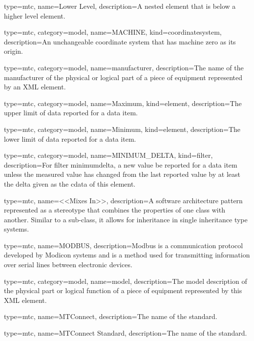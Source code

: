 {
  type=mtc,
  name={Lower Level},
  description={A nested element that is below a higher level element.}
}


{
  type=mtc,
  category=model,
  name={MACHINE},
  kind={coordinatesystem},
  description={An unchangeable coordinate system that has machine zero as its origin.}
}


{
  type=mtc,
  category=model,
  name={manufacturer},
  description={The name of the manufacturer of the physical or logical part of a piece of equipment represented by an XML element.}
}


{
  type=mtc,
  category=model,
  name={Maximum},
  kind={element},
  description={The upper limit of data reported for a data item.}
}


{
  type=mtc,
  category=model,
  name={Minimum},
  kind={element},
  description={The lower limit of data reported for a data item.}
}



{
  type=mtc,
  category=model,
  name={MINIMUM\_DELTA},
  kind={filter},
  description={For \gls{filter} \gls{minimumdelta}, a new value \MUSTNOT be reported for a data item unless the measured value has changed from the last reported value by at least the delta given as the \gls{cdata} of this element.}
}


{
  type=mtc,
  name={<<Mixes In>>},
  description={A software architecture pattern represented as a \gls{stereotype} that combines the properties of one class with another. Similar to a sub-class, it allows for inheritance in single inheritance type systems.}
}


{
  type=mtc,
  name=MODBUS,
  description={Modbus is a communication protocol developed by Modicon systems and is a method used for transmitting information over serial lines between electronic devices.}
}


{
  type=mtc,
  category=model,
  name={model},
  description={The model description of the physical part or logical function of a piece of equipment represented by this XML element.}
}


{
  type=mtc,
  name={MTConnect},
  description={The name of the standard.}
}

{
  type=mtc,
  name={MTConnect Standard},
  description={The name of the standard.}
}

